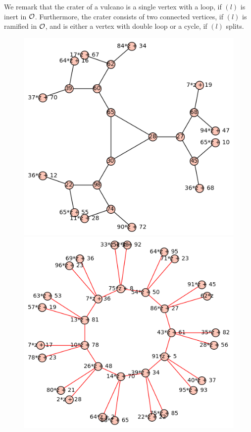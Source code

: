 We remark that the crater of a vulcano is a single vertex with a loop, if $(l)$ is inert in $\mathcal{O}$.
Furthermore, the crater consists of two connected vertices, if $(l)$ is ramified in $\mathcal{O}$, and is either a vertex with double loop or a cycle, if $(l)$ splits.
\begin{figure}
    \begin{minipage}{0.5\textwidth}
        \includegraphics[width = \textwidth]{../example_odd_crater_fp.png}
    \end{minipage}%
    \begin{minipage}{0.5\textwidth}
        \includegraphics[width = \textwidth]{../example_odd_crater.png}

\end{minipage}
\end{figure}
